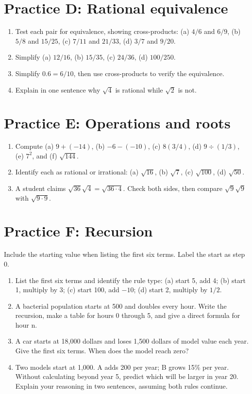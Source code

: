 \section*{Practice D: Rational equivalence}
\begin{enumerate}[label=D\arabic*.,leftmargin=2.5em,itemsep=10pt]
\item Test each pair for equivalence, showing cross-products: (a) $4/6$ and $6/9$, (b) $5/8$ and $15/25$, (c) $7/11$ and $21/33$, (d) $3/7$ and $9/20$.
\item Simplify (a) $12/16$, (b) $15/35$, (c) $24/36$, (d) $100/250$.
\item Simplify $0.6=6/10$, then use cross-products to verify the equivalence.
\item Explain in one sentence why $\sqrt4$ is rational while $\sqrt2$ is not.
\end{enumerate}
\section*{Practice E: Operations and roots}
\begin{enumerate}[label=E\arabic*.,leftmargin=2.5em,itemsep=10pt]
\item Compute (a) $9+(-14)$, (b) $-6-(-10)$, (c) $8(3/4)$, (d) $9\div(1/3)$, (e) $7^2$, and (f) $\sqrt{144}$.
\item Identify each as rational or irrational: (a) $\sqrt{16}$, (b) $\sqrt7$, (c) $\sqrt{100}$, (d) $\sqrt{50}$.
\item A student claims $\sqrt{36}\sqrt4=\sqrt{36\cdot4}$. Check both sides, then compare $\sqrt9\sqrt9$ with $\sqrt{9\cdot9}$.
\end{enumerate}
\section*{Practice F: Recursion}
Include the starting value when listing the first six terms. Label the start as step 0.
\begin{enumerate}[label=F\arabic*.,leftmargin=2.5em,itemsep=10pt]
\item List the first six terms and identify the rule type: (a) start 5, add 4; (b) start 1, multiply by 3; (c) start 100, add $-10$; (d) start 2, multiply by $1/2$.
\item A bacterial population starts at 500 and doubles every hour. Write the recursion, make a table for hours 0 through 5, and give a direct formula for hour n.
\item A car starts at 18,000 dollars and loses 1,500 dollars of model value each year. Give the first six terms. When does the model reach zero?
\item Two models start at 1,000. A adds 200 per year; B grows 15\% per year. Without calculating beyond year 5, predict which will be larger in year 20. Explain your reasoning in two sentences, assuming both rules continue.
\end{enumerate}
